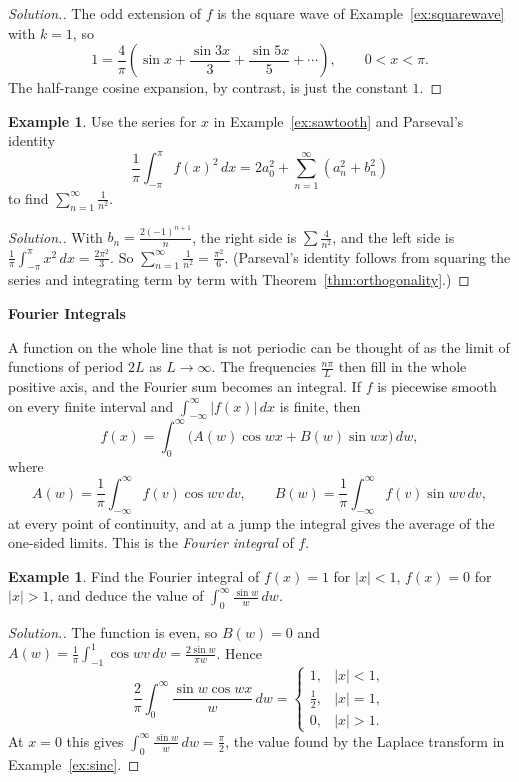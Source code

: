\documentclass[11pt,a4paper]{article}
\theoremstyle{definition}
\newtheorem{exa}[thm]{Example}
\newenvironment{solution}
  {\renewcommand{\qedsymbol}{}\begin{proof}[\textit{Solution}.]}
  {\end{proof}}
\newcommand{\subhead}[1]{%
  \par\medskip\noindent\textbf{#1}\par\nobreak\smallskip}
\begin{document}
\begin{solution}
The odd extension of $f$ is the square wave of Example~\ref{ex:squarewave} with
$k = 1$, so
\[1 = \frac4\pi\left(\sin x + \frac{\sin 3x}{3} + \frac{\sin 5x}{5} +
\cdots\right),\qquad 0<x<\pi .\]
The half-range cosine expansion, by contrast, is just the constant $1$.
\end{solution}

\begin{exa}
\label{ex:parseval}
Use the series for $x$ in Example~\ref{ex:sawtooth} and Parseval's identity
\[\frac{1}{\pi}\int_{-\pi}^\pi f(x)^2\,dx = 2a_0^2 + \sum_{n=1}^\infty(a_n^2 +
b_n^2)\]
to find $\sum_{n=1}^\infty\frac{1}{n^2}$.
\end{exa}

\begin{solution}
With $b_n = \frac{2(-1)^{n+1}}{n}$, the right side is $\sum\frac{4}{n^2}$, and the
left side is $\frac1\pi\int_{-\pi}^\pi x^2\,dx = \frac{2\pi^2}{3}$. So
$\sum_{n=1}^\infty\frac{1}{n^2} = \frac{\pi^2}{6}$. (Parseval's identity follows
from squaring the series and integrating term by term with
Theorem~\ref{thm:orthogonality}.)
\end{solution}

\subhead{Fourier Integrals}

A function on the whole line that is not periodic can be thought of as the limit
of functions of period $2L$ as $L\to\infty$. The frequencies $\frac{n\pi}{L}$ then
fill in the whole positive axis, and the Fourier sum becomes an integral. If $f$
is piecewise smooth on every finite interval and $\int_{-\infty}^\infty|f(x)|\,dx$
is finite, then
\[f(x) = \int_0^\infty\big(A(w)\cos wx + B(w)\sin wx\big)\,dw ,\]
where
\[A(w) = \frac1\pi\int_{-\infty}^\infty f(v)\cos wv\,dv ,\qquad B(w) =
\frac1\pi\int_{-\infty}^\infty f(v)\sin wv\,dv ,\]
at every point of continuity, and at a jump the integral gives the average of
the one-sided limits. This is the \emph{Fourier integral} of $f$.

\begin{exa}
\label{ex:fourierintegral}
Find the Fourier integral of $f(x) = 1$ for $|x|<1$, $f(x) = 0$ for $|x|>1$, and
deduce the value of $\int_0^\infty\frac{\sin w}{w}\,dw$.
\end{exa}

\begin{solution}
The function is even, so $B(w) = 0$ and
$A(w) = \frac1\pi\int_{-1}^1\cos wv\,dv = \frac{2\sin w}{\pi w}$. Hence
\[\frac2\pi\int_0^\infty\frac{\sin w\cos wx}{w}\,dw =
\begin{cases}
1, & |x|<1,\\
\frac12, & |x| = 1,\\
0, & |x|>1 .
\end{cases}\]
At $x = 0$ this gives $\int_0^\infty\frac{\sin w}{w}\,dw = \frac{\pi}{2}$, the
value found by the Laplace transform in Example~\ref{ex:sinc}.
\end{solution}
\end{document}
